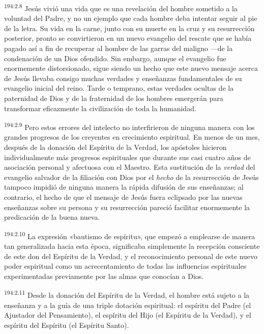 \par 
\textsuperscript{194:2.8} Jesús vivió una vida que es una revelación del hombre sometido a la voluntad del Padre, y no un ejemplo que cada hombre deba intentar seguir al pie de la letra. Su vida en la carne, junto con su muerte en la cruz y su resurrección posterior, pronto se convirtieron en un nuevo evangelio del rescate que se había pagado así a fin de recuperar al hombre de las garras del maligno ---de la condenación de un Dios ofendido. Sin embargo, aunque el evangelio fue enormemente distorsionado, sigue siendo un hecho que este nuevo mensaje acerca de Jesús llevaba consigo muchas verdades y enseñanzas fundamentales de su evangelio inicial del reino. Tarde o temprano, estas verdades ocultas de la paternidad de Dios y de la fraternidad de los hombres emergerán para transformar eficazmente la civilización de toda la humanidad.

\par 
\textsuperscript{194:2.9} Pero estos errores del intelecto no interfirieron de ninguna manera con los grandes progresos de los creyentes en crecimiento espiritual. En menos de un mes, después de la donación del Espíritu de la Verdad, los apóstoles hicieron individualmente más progresos espirituales que durante sus casi cuatro años de asociación personal y afectuosa con el Maestro. Esta sustitución de la \textit{verdad} del evangelio salvador de la filiación con Dios por el \textit{hecho} de la resurrección de Jesús tampoco impidió de ninguna manera la rápida difusión de sus enseñanzas; al contrario, el hecho de que el mensaje de Jesús fuera eclipsado por las nuevas enseñanzas sobre su persona y su resurrección pareció facilitar enormemente la predicación de la buena nueva.

\par 
\textsuperscript{194:2.10} La expresión «bautismo de espíritu», que empezó a emplearse de manera tan generalizada hacia esta época, significaba simplemente la recepción consciente de este don del Espíritu de la Verdad, y el reconocimiento personal de este nuevo poder espiritual como un acrecentamiento de todas las influencias espirituales experimentadas previamente por las almas que conocían a Dios.

\par 
\textsuperscript{194:2.11} Desde la donación del Espíritu de la Verdad, el hombre está sujeto a la enseñanza y a la guía de una triple dotación espiritual: el espíritu del Padre (el Ajustador del Pensamiento), el espíritu del Hijo (el Espíritu de la Verdad), y el espíritu del Espíritu (el Espíritu Santo).

